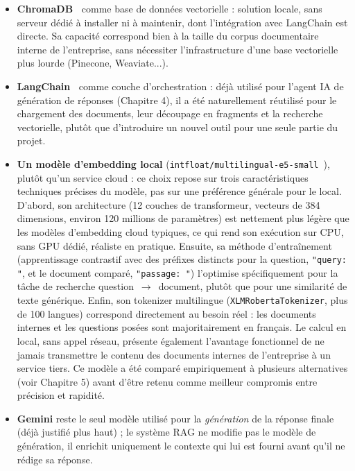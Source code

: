 \documentclass[12pt,a4paper]{report}
\begin{document}
\begin{itemize}
    \item \textbf{ChromaDB~\cite{chroma}} comme base de données vectorielle : solution
    locale, sans serveur dédié à installer ni à maintenir, dont
    l'intégration avec LangChain est directe. Sa capacité correspond bien
    à la taille du corpus documentaire interne de l'entreprise, sans
    nécessiter l'infrastructure d'une base vectorielle plus lourde
    (Pinecone, Weaviate...).
    \item \textbf{LangChain~\cite{langchain}} comme couche d'orchestration : déjà utilisé
    pour l'agent IA de génération de réponses (Chapitre 4), il a été
    naturellement réutilisé pour le chargement des documents, leur
    découpage en fragments et la recherche vectorielle, plutôt que
    d'introduire un nouvel outil pour une seule partie du projet.
    \item \textbf{Un modèle d'embedding local}
    (\texttt{intfloat/multilingual-e5-small}~\cite{e5}), plutôt qu'un service
    cloud : ce choix repose sur trois caractéristiques techniques
    précises du modèle, pas sur une préférence générale pour le local.
    D'abord, son architecture (12 couches de transformeur, vecteurs de
    384 dimensions, environ 120 millions de paramètres) est nettement
    plus légère que les modèles d'embedding cloud typiques, ce qui rend
    son exécution sur CPU, sans GPU dédié, réaliste en pratique. Ensuite,
    sa méthode d'entraînement (apprentissage contrastif avec des
    préfixes distincts pour la question, \texttt{"query: "}, et le
    document comparé, \texttt{"passage: "}) l'optimise spécifiquement
    pour la tâche de recherche question~$\rightarrow$~document, plutôt
    que pour une similarité de texte générique. Enfin, son tokenizer
    multilingue (\texttt{XLMRobertaTokenizer}, plus de 100 langues)
    correspond directement au besoin réel : les documents internes et
    les questions posées sont majoritairement en français. Le calcul en
    local, sans appel réseau, présente également l'avantage fonctionnel
    de ne jamais transmettre le contenu des documents internes de
    l'entreprise à un service tiers. Ce modèle a été comparé
    empiriquement à plusieurs alternatives (voir Chapitre 5) avant
    d'être retenu comme meilleur compromis entre précision et rapidité.
    \item \textbf{Gemini} reste le seul modèle utilisé pour la
    \emph{génération} de la réponse finale (déjà justifié plus haut) ; le
    système RAG ne modifie pas le modèle de génération, il enrichit
    uniquement le contexte qui lui est fourni avant qu'il ne rédige sa
    réponse.
\end{itemize}
\end{document}
